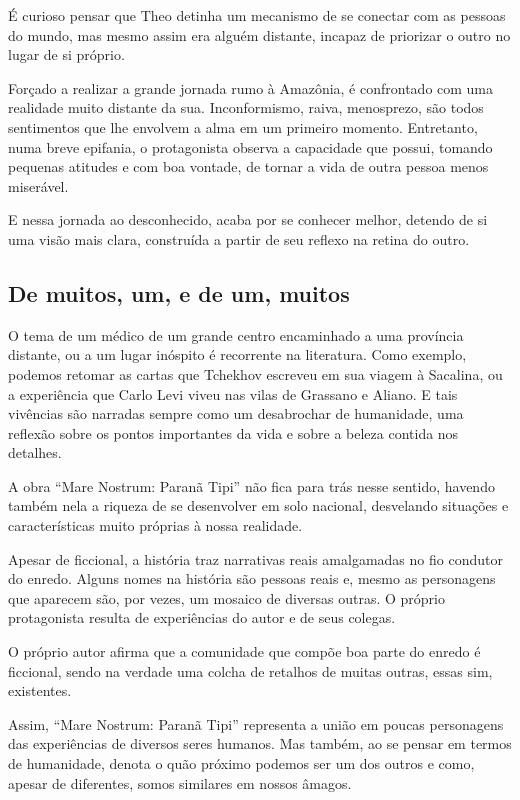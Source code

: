 \documentclass[12pt]{extarticle}
\begin{document}
É curioso pensar que Theo detinha um mecanismo de se conectar com as pessoas do mundo, mas mesmo assim era alguém distante, incapaz de priorizar o outro no lugar de si próprio.

Forçado a realizar a grande jornada rumo à Amazônia, é confrontado com
uma realidade muito distante da sua. Inconformismo, raiva, menosprezo,
são todos sentimentos que lhe envolvem a alma em um primeiro momento.
Entretanto, numa breve epifania, o
protagonista observa a capacidade que possui, tomando pequenas atitudes e com boa vontade, de
tornar a vida de outra pessoa menos miserável.

E nessa jornada ao desconhecido, acaba por se conhecer melhor, detendo
de si uma visão mais clara, construída a partir de seu reflexo na retina
do outro.

\subsection{De muitos, um, e de um, muitos}

O tema de um médico de um grande centro encaminhado a uma província
distante, ou a um lugar inóspito é recorrente na literatura. Como
exemplo, podemos retomar as cartas que Tchekhov escreveu em sua viagem à
Sacalina, ou a experiência que Carlo Levi viveu nas vilas de Grassano e
Aliano. E tais vivências são narradas sempre como um desabrochar de
humanidade, uma reflexão sobre os pontos importantes da vida e sobre a
beleza contida nos detalhes.

A obra ``Mare Nostrum: Paranã Tipi'' não fica para trás nesse sentido,
havendo também nela a riqueza de se desenvolver em solo nacional,
desvelando situações e características muito próprias à nossa realidade.

Apesar de ficcional, a história traz narrativas reais amalgamadas no fio
condutor do enredo. Alguns nomes na história são pessoas reais e, mesmo
as personagens que aparecem são, por vezes, um mosaico de diversas
outras. O próprio protagonista resulta de experiências do autor e de
seus colegas.

O próprio autor afirma que a comunidade que compõe boa parte do enredo é
ficcional, sendo na verdade uma colcha de retalhos de muitas outras,
essas sim, existentes.

Assim, ``Mare Nostrum: Paranã Tipi'' representa a união em poucas
personagens das experiências de diversos seres humanos. Mas também, ao
se pensar em termos de humanidade, denota o quão próximo podemos ser um
dos outros e como, apesar de diferentes, somos similares em nossos
âmagos.
\end{document}
